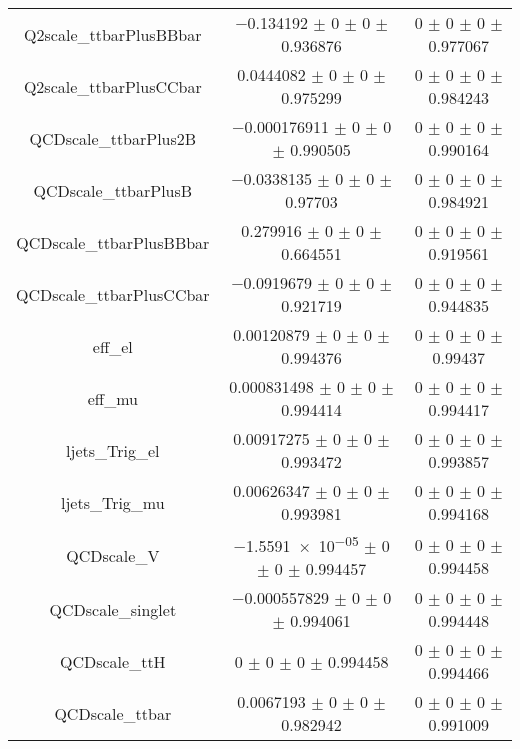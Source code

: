 \begin{table}
\begin{tabular}{ccc}
Q2scale\_ttbarPlusBBbar & \num{-0.134192} $\pm$ \num{0} $\pm$ \num{0} $\pm$ \num{0.936876} & \num{0} $\pm$ \num{0} $\pm$ \num{0} $\pm$ \num{0.977067}\\
Q2scale\_ttbarPlusCCbar & \num{0.0444082} $\pm$ \num{0} $\pm$ \num{0} $\pm$ \num{0.975299} & \num{0} $\pm$ \num{0} $\pm$ \num{0} $\pm$ \num{0.984243}\\
QCDscale\_ttbarPlus2B & \num{-0.000176911} $\pm$ \num{0} $\pm$ \num{0} $\pm$ \num{0.990505} & \num{0} $\pm$ \num{0} $\pm$ \num{0} $\pm$ \num{0.990164}\\
QCDscale\_ttbarPlusB & \num{-0.0338135} $\pm$ \num{0} $\pm$ \num{0} $\pm$ \num{0.97703} & \num{0} $\pm$ \num{0} $\pm$ \num{0} $\pm$ \num{0.984921}\\
QCDscale\_ttbarPlusBBbar & \num{0.279916} $\pm$ \num{0} $\pm$ \num{0} $\pm$ \num{0.664551} & \num{0} $\pm$ \num{0} $\pm$ \num{0} $\pm$ \num{0.919561}\\
QCDscale\_ttbarPlusCCbar & \num{-0.0919679} $\pm$ \num{0} $\pm$ \num{0} $\pm$ \num{0.921719} & \num{0} $\pm$ \num{0} $\pm$ \num{0} $\pm$ \num{0.944835}\\
eff\_el & \num{0.00120879} $\pm$ \num{0} $\pm$ \num{0} $\pm$ \num{0.994376} & \num{0} $\pm$ \num{0} $\pm$ \num{0} $\pm$ \num{0.99437}\\
eff\_mu & \num{0.000831498} $\pm$ \num{0} $\pm$ \num{0} $\pm$ \num{0.994414} & \num{0} $\pm$ \num{0} $\pm$ \num{0} $\pm$ \num{0.994417}\\
ljets\_Trig\_el & \num{0.00917275} $\pm$ \num{0} $\pm$ \num{0} $\pm$ \num{0.993472} & \num{0} $\pm$ \num{0} $\pm$ \num{0} $\pm$ \num{0.993857}\\
ljets\_Trig\_mu & \num{0.00626347} $\pm$ \num{0} $\pm$ \num{0} $\pm$ \num{0.993981} & \num{0} $\pm$ \num{0} $\pm$ \num{0} $\pm$ \num{0.994168}\\
QCDscale\_V & \num{-1.5591e-05} $\pm$ \num{0} $\pm$ \num{0} $\pm$ \num{0.994457} & \num{0} $\pm$ \num{0} $\pm$ \num{0} $\pm$ \num{0.994458}\\
QCDscale\_singlet & \num{-0.000557829} $\pm$ \num{0} $\pm$ \num{0} $\pm$ \num{0.994061} & \num{0} $\pm$ \num{0} $\pm$ \num{0} $\pm$ \num{0.994448}\\
QCDscale\_ttH & \num{0} $\pm$ \num{0} $\pm$ \num{0} $\pm$ \num{0.994458} & \num{0} $\pm$ \num{0} $\pm$ \num{0} $\pm$ \num{0.994466}\\
QCDscale\_ttbar & \num{0.0067193} $\pm$ \num{0} $\pm$ \num{0} $\pm$ \num{0.982942} & \num{0} $\pm$ \num{0} $\pm$ \num{0} $\pm$ \num{0.991009}\\

\end{tabular}
\end{table}
